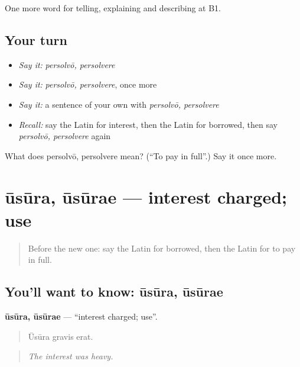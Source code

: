 \begin{grammarlens}[title={What you've built}]
One more word for telling, explaining and describing at B1.
\end{grammarlens}

\subsection*{Your turn}
\begin{itemize}
\raggedright
  \item \emph{Say it:} \emph{persolvō, persolvere}
  \item \emph{Say it:} \emph{persolvō, persolvere}, once more
  \item \emph{Say it:} a sentence of your own with \emph{persolvō, persolvere}
  \item \emph{Recall:} say the Latin for interest, then the Latin for borrowed, then say \emph{persolvō, persolvere} again
\end{itemize}

\begin{tcolorbox}[breakable,colback=teal!4,colframe=teal!35!black,title={Before you move on}]
What does persolvō, persolvere mean? (\textquotedblleft{}To pay in full\textquotedblright{}.) Say it once more.
\end{tcolorbox}
\section[ūsūra, ūsūrae]{ūsūra, ūsūrae — interest charged; use}

\label{lesson:LA-C419-usura}



\begin{quote}
Before the new one: say the Latin for borrowed, then the Latin for to pay in full.
\end{quote}

\subsection*{You'll want to know: ūsūra, ūsūrae}
\textbf{ūsūra, ūsūrae} — \textquotedblleft{}interest charged; use\textquotedblright{}.

\begin{quote}
Ūsūra gravis erat.
\end{quote}

\begin{quote}
\emph{The interest was heavy.}
\end{quote}

